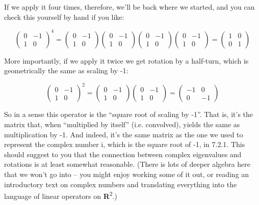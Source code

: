 \documentclass[oneside,english]{amsbook}
\numberwithin{section}{chapter}
\theoremstyle{plain}
\theoremstyle{definition}
\begin{document}
If we apply it four times, therefore, we'll be back where we started,
and you can check this yourself by hand if you like:

\[\begin{pmatrix}
	0 & - 1 \\
	1 & 0
\end{pmatrix}^{4} = \begin{pmatrix}
	0 & - 1 \\
	1 & 0
\end{pmatrix}\begin{pmatrix}
	0 & - 1 \\
	1 & 0
\end{pmatrix}\begin{pmatrix}
	0 & - 1 \\
	1 & 0
\end{pmatrix}\begin{pmatrix}
	0 & - 1 \\
	1 & 0
\end{pmatrix} = \begin{pmatrix}
	1 & 0 \\
	0 & 1
\end{pmatrix}\]

More importantly, if we apply it twice we get rotation by a half-turn,
which is geometrically the same as scaling by -1:

\[\begin{pmatrix}
	0 & - 1 \\
	1 & 0
\end{pmatrix}^{2} = \begin{pmatrix}
	0 & - 1 \\
	1 & 0
\end{pmatrix}\begin{pmatrix}
	0 & - 1 \\
	1 & 0
\end{pmatrix} = \begin{pmatrix}
	- 1 & 0 \\
	0 & - 1
\end{pmatrix}\]

So in a sense this operator is the ``square root of scaling by -1''.
That is, it's the matrix that, when ``multiplied by itself'' (i.e.
convolved), yields the same as multiplication by -1. And indeed, it's
the same matrix as the one we used to represent the complex number i,
which is the square root of -1, in 7.2.1. This should suggest to you
that the connection between complex eigenvalues and rotations is at
least somewhat reasonable. (There is lots of deeper algebra here that we
won't go into -- you might enjoy working some of it out, or reading an
introductory text on complex numbers and translating everything into the
language of linear operators on \textbf{R}\textsuperscript{2}.)
\end{document}
